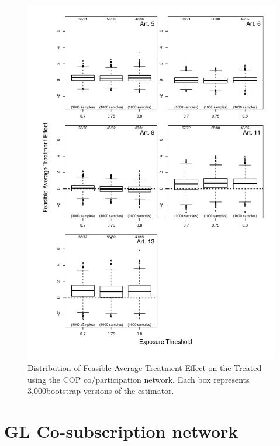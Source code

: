 \documentclass[10pt]{article}
\def\nreps{3,000}
\begin{document}
\begin{figure}[H]
	\centering
	\includegraphics[width=.8\linewidth]{../fig/matching_bloxplot_adjmat_fctc_cop_coparticipation_twomode.pdf}
	\caption{Distribution of Feasible Average Treatment Effect on the Treated using the COP co/participation network. Each box represents \nreps bootstrap versions of the estimator.}
\end{figure}

\section{GL Co-subscription network}
\end{document}
